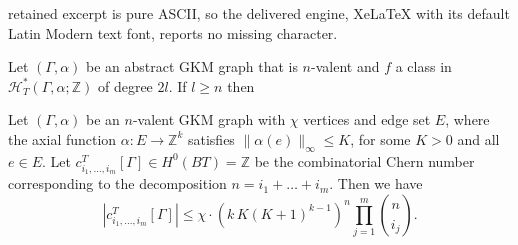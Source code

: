 \documentclass[10pt,a4paper]{amsart}
\newcommand{\ZZ}{\mathbb{Z}}
\begin{document}
retained excerpt is pure ASCII, so the delivered engine, XeLaTeX with its default Latin Modern text font, reports no missing character.
\begin{lemma}\label{ABBV integers}
Let $(\Gamma,\alpha)$ be an abstract GKM graph that is $n$-valent and $f$ a class in
$\mathcal{H}^*_T(\Gamma, \alpha;\ZZ)$ of degree $2l$. If $l\geq n$ then
\end{lemma}

\begin{prop}\label{prop: chernbound}
Let $(\Gamma,\alpha)$ be an $n$-valent GKM graph with $\chi$ vertices and edge set $E$, where the axial function $\alpha\colon E\rightarrow \ZZ^k$ satisfies $\|\alpha(e)\|_\infty \leq K$, for some $K>0$ and all $e\in E$. 
Let $c^T_{i_1,\ldots,i_m}[\Gamma]\in  H^{0}(BT)=\ZZ$ be the combinatorial Chern number corresponding to the decomposition $n=i_1+\ldots+i_m$. Then we have
\[|c^T_{i_1,\ldots,i_m}[\Gamma]|\leq\chi\cdot (k\,K (K+1)^{k-1})^n\prod_{j=1}^m {n\choose i_j}.\]
\end{prop}
\end{document}
